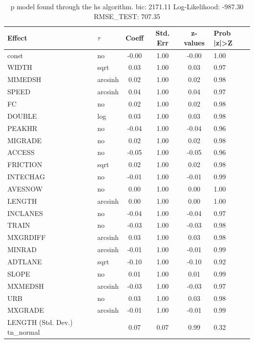 \begin{table}
	\caption{p model found through the hs algorithm. bic: 2171.11 Log-Likelihood: -987.30 RMSE_TEST: 707.35}
	\begin{center}
		\begin{tabular}{|l|l|c|c|c|l|}
			\hline
			Effect & $\tau$ & Coeff & Std. Err & z-values & Prob |z|>Z \\
			\hline
			const & no & -0.00 & 1.00 & -0.00 & 1.00 \\
			\hline
			WIDTH & sqrt & 0.03 & 1.00 & 0.03 & 0.97 \\
			\hline
			MIMEDSH & arcsinh & 0.02 & 1.00 & 0.02 & 0.98 \\
			\hline
			SPEED & arcsinh & 0.04 & 1.00 & 0.04 & 0.97 \\
			\hline
			FC & no & 0.02 & 1.00 & 0.02 & 0.98 \\
			\hline
			DOUBLE & log & 0.03 & 1.00 & 0.03 & 0.98 \\
			\hline
			PEAKHR & no & -0.04 & 1.00 & -0.04 & 0.96 \\
			\hline
			MIGRADE & no & 0.02 & 1.00 & 0.02 & 0.98 \\
			\hline
			ACCESS & no & -0.05 & 1.00 & -0.05 & 0.96 \\
			\hline
			FRICTION & sqrt & 0.02 & 1.00 & 0.02 & 0.98 \\
			\hline
			INTECHAG & no & -0.01 & 1.00 & -0.01 & 0.99 \\
			\hline
			AVESNOW & no & 0.00 & 1.00 & 0.00 & 1.00 \\
			\hline
			LENGTH & arcsinh & 0.00 & 1.00 & 0.00 & 1.00 \\
			\hline
			INCLANES & no & -0.04 & 1.00 & -0.04 & 0.97 \\
			\hline
			TRAIN & no & -0.03 & 1.00 & -0.03 & 0.98 \\
			\hline
			MXGRDIFF & arcsinh & 0.03 & 1.00 & 0.03 & 0.98 \\
			\hline
			MINRAD & arcsinh & -0.01 & 1.00 & -0.01 & 0.99 \\
			\hline
			ADTLANE & sqrt & -0.10 & 1.00 & -0.10 & 0.92 \\
			\hline
			SLOPE & no & 0.01 & 1.00 & 0.01 & 0.99 \\
			\hline
			MXMEDSH & arcsinh & -0.03 & 1.00 & -0.03 & 0.97 \\
			\hline
			URB & no & 0.03 & 1.00 & 0.03 & 0.98 \\
			\hline
			MXGRADE & arcsinh & -0.01 & 1.00 & -0.01 & 0.99 \\
			\hline
			LENGTH (Std. Dev.) tn_normal &  & 0.07 & 0.07 & 0.99 & 0.32 \\

\end{tabular}
\end{center}
\end{table}
